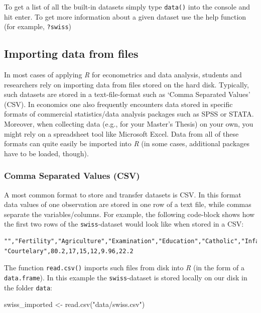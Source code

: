 \documentclass[
  12pt,
]{style/krantz}
\newenvironment{Shaded}{\begin{snugshade}}{\end{snugshade}}
\newcommand{\FunctionTok}[1]{\textcolor[rgb]{0.00,0.00,0.00}{#1}}
\newcommand{\NormalTok}[1]{#1}
\newcommand{\OtherTok}[1]{\textcolor[rgb]{0.56,0.35,0.01}{#1}}
\newcommand{\StringTok}[1]{\textcolor[rgb]{0.31,0.60,0.02}{#1}}
\begin{document}
To get a list of all the built-in datasets simply type \texttt{data()} into the console and hit enter. To get more information about a given dataset use the help function (for example, \texttt{?swiss})

\hypertarget{importing-data-from-files}{%
\subsection{Importing data from files}\label{importing-data-from-files}}

In most cases of applying \emph{R} for econometrics and data analysis, students and researchers rely on importing data from files stored on the hard disk. Typically, such datasets are stored in a text-file-format such as `Comma Separated Values' (CSV). In economics one also frequently encounters data stored in specific formats of commercial statistics/data analysis packages such as SPSS or STATA. Moreover, when collecting data (e.g., for your Master's Thesis) on your own, you might rely on a spreadsheet tool like Microsoft Excel. Data from all of these formats can quite easily be imported into \emph{R} (in some cases, additional packages have to be loaded, though).

\hypertarget{comma-separated-values-csv}{%
\subsubsection{Comma Separated Values (CSV)}\label{comma-separated-values-csv}}

A most common format to store and transfer datasets is CSV. In this format data values of one observation are stored in one row of a text file, while commas separate the variables/columns. For example, the following code-block shows how the first two rows of the \texttt{swiss}-dataset would look like when stored in a CSV:

\begin{verbatim}
"","Fertility","Agriculture","Examination","Education","Catholic","Infant.Mortality"
"Courtelary",80.2,17,15,12,9.96,22.2
\end{verbatim}

The function \texttt{read.csv()} imports such files from disk into \emph{R} (in the form of a \texttt{data.frame}). In this example the \texttt{swiss}-dataset is stored locally on our disk in the folder \texttt{data}:

\begin{Shaded}
\begin{Highlighting}[]
\NormalTok{swiss\_imported }\OtherTok{\textless{}{-}} \FunctionTok{read.csv}\NormalTok{(}\StringTok{"data/swiss.csv"}\NormalTok{)}
\end{Highlighting}
\end{Shaded}
\end{document}
